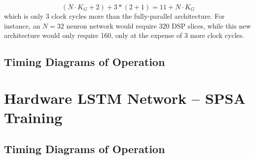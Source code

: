 \begin{equation}\label{eq:numcc_network-opt}
    (N \cdot K_G + 2) + 3*(2 + 1)  = 11 + N\cdot K_G
\end{equation}
which is only 3 clock cycles more than the fully-parallel architecture. For instance, an $N=32$ neuron network would require 320 DSP slices, while this new architecture would only require 160, only at the expense of 3 more clock cycles.

\subsection{Timing Diagrams of Operation}

\section{Hardware LSTM Network -- SPSA Training}

\subsection{Timing Diagrams of Operation}
